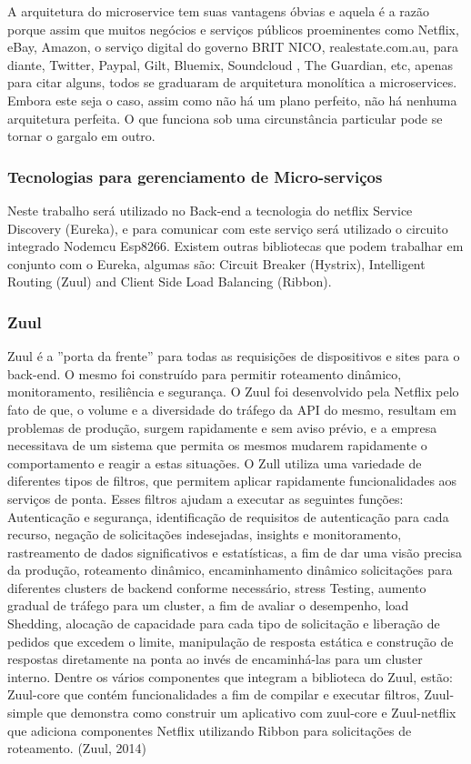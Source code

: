 \documentclass[journal]{IEEEtran}
\begin{document}
A arquitetura do microservice tem suas vantagens óbvias e aquela é a razão porque assim que muitos negócios e serviços públicos proeminentes como Netflix, eBay, Amazon, o serviço digital do governo BRIT NICO, realestate.com.au, para diante, Twitter, Paypal, Gilt, Bluemix, Soundcloud , The Guardian, etc, apenas para citar alguns, todos se graduaram de arquitetura monolítica a microservices. Embora este seja o caso, assim como não há um plano perfeito, não há nenhuma arquitetura perfeita. O que funciona sob uma circunstância particular pode se tornar o gargalo em outro.

\subsubsection{Tecnologias para gerenciamento de Micro-serviços}
Neste trabalho será utilizado no Back-end a tecnologia do netflix Service Discovery (Eureka), e para comunicar com este serviço será utilizado o circuito integrado Nodemcu Esp8266. Existem outras bibliotecas que podem trabalhar em conjunto com o Eureka, algumas são: Circuit Breaker (Hystrix), Intelligent Routing (Zuul) and Client Side Load Balancing (Ribbon). 

\subsubsection{Zuul}
Zuul é a ''porta da frente'' para todas as requisições de dispositivos e sites para o back-end. O mesmo foi construído para permitir roteamento dinâmico, monitoramento, resiliência e segurança. O Zuul foi desenvolvido pela Netflix pelo fato de que, o volume e a diversidade do tráfego da API do mesmo, resultam em problemas de produção, surgem rapidamente e sem aviso prévio, e a empresa necessitava de um sistema que permita os mesmos mudarem rapidamente o comportamento e reagir a estas situações.
O Zull utiliza uma variedade de diferentes tipos de filtros, que permitem aplicar rapidamente funcionalidades aos serviços de ponta. Esses filtros ajudam a executar as seguintes funções: Autenticação e segurança, identificação de requisitos de autenticação para cada recurso, negação de solicitações indesejadas, insights e monitoramento, rastreamento de dados significativos e estatísticas, a fim de dar uma visão precisa da produção, roteamento dinâmico, encaminhamento dinâmico solicitações para diferentes clusters de backend conforme necessário, stress Testing, aumento gradual de tráfego para um cluster, a fim de avaliar o desempenho, load Shedding, alocação de capacidade para cada tipo de solicitação e liberação de pedidos que excedem o limite, manipulação de resposta estática e construção de respostas diretamente na ponta ao invés de encaminhá-las para um cluster interno.
Dentre os vários componentes que integram a biblioteca do Zuul, estão: Zuul-core que contém funcionalidades a fim de compilar e executar filtros, Zuul-simple que demonstra como construir um aplicativo com zuul-core e Zuul-netflix que adiciona componentes Netflix utilizando Ribbon para solicitações de roteamento. (Zuul, 2014)
\end{document}
